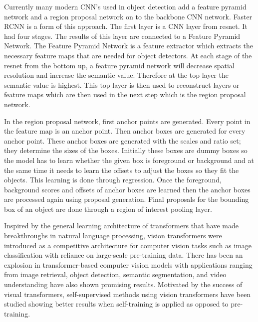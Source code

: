 \documentclass[10pt,twocolumn,letterpaper]{article}
\begin{document}
Currently many modern CNN's used in object detection add a feature pyramid network and a region proposal network on to the backbone CNN network. Faster RCNN is a form of this approach. The first layer is a CNN layer from resnet. It had four stages. The results of this layer are connected to a Feature Pyramid Network. The Feature Pyramid Network is a feature extractor which extracts the necessary feature maps that are needed for object detectors. At each stage of the resnet from the bottom up, a feature pyramid network will decrease spatial resolution and increase the semantic value. Therefore at the top layer the semantic value is highest. This top layer is then used to reconstruct layers or feature maps which are then used in the next step which is the region proposal network. 

In the region proposal network, first anchor points are generated. Every point in the feature map is an anchor point. Then anchor boxes are generated for every anchor point. These anchor boxes are generated with the scales and ratio set; they determine the sizes of the boxes. Initially these boxes are dummy boxes so the model has to learn whether the given box is foreground or background and at the same time it needs to learn the offsets to adjust the boxes so they fit the objects. This learning is done through regression. Once the foreground, background scores and offsets of anchor boxes are learned then the anchor boxes are processed again using proposal generation. Final proposals for the bounding box of an object are done through a region of interest pooling layer.



Inspired by the general learning architecture of transformers\cite{vaswani2017attention} that have made breakthroughs in natural language processing, vision transformers were introduced as a competitive architecture for computer vision tasks such as image classification\cite{dosovitskiy2020image} with reliance on large-scale pre-training data. There has been an explosion in transformer-based computer vision models with applications ranging from image retrieval\cite{el2021training}, object detection\cite{liu2021swin}, semantic segmentation\cite{wang2021pyramid}\cite{zhang2021multi}\cite{https://doi.org/10.48550/arxiv.2012.15840}, and video understanding\cite{https://doi.org/10.48550/arxiv.2103.15691}\cite{bertasius2021space}\cite{https://doi.org/10.48550/arxiv.2104.11227} have also shown promising results. Motivated by the success of visual transformers, self-supervised methods using vision transformers have been studied showing better results when self-training is applied as opposed to pre-training\cite{zoph2020rethinking}\cite{https://doi.org/10.48550/arxiv.2104.14294}.
\end{document}
